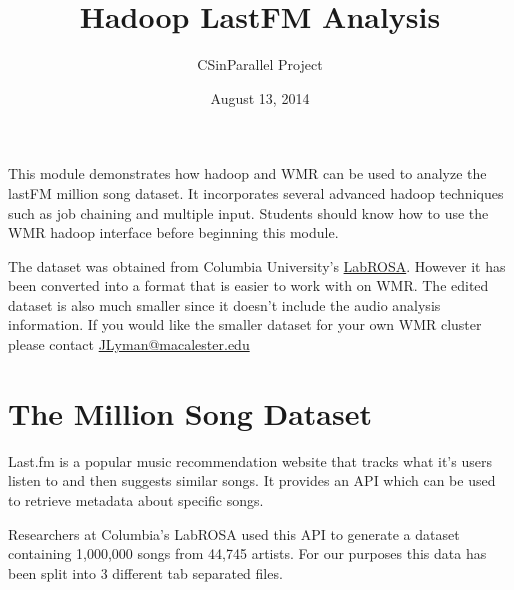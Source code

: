 \documentclass[letterpaper,10pt,openany,oneside]{sphinxmanual}
\title{Hadoop LastFM Analysis}
\date{August 13, 2014}
\author{CSinParallel Project}
\begin{document}
\maketitle
\tableofcontents
{}\label{index::doc}


This module demonstrates how hadoop and WMR can be used to
analyze the lastFM million song dataset. It incorporates several
advanced hadoop techniques such as job chaining and multiple
input. Students should know how to use the WMR hadoop interface
before beginning this module.

The dataset was obtained from Columbia University's
\href{http://labrosa.ee.columbia.edu/millionsong/lastfm}{LabROSA}.
However it has been converted into a format that is easier to work
with on WMR. The edited dataset is also much smaller since it doesn't
include the audio analysis information. If you would like the smaller
dataset for your own WMR cluster please contact \href{mailto:JLyman@macalester.edu}{JLyman@macalester.edu}


\chapter{The Million Song Dataset}
\label{0-Introduction/Introduction::doc}\label{0-Introduction/Introduction:the-million-song-dataset}\label{0-Introduction/Introduction:hadoop-lastfm-analysis}
Last.fm is a popular music recommendation website that tracks
what it's users listen to and then suggests similar songs.
It provides an API which can be used to retrieve metadata about
specific songs.

Researchers at Columbia's LabROSA used this API to generate a
dataset containing 1,000,000 songs from 44,745 artists. For our
purposes this data has been split into 3 different tab separated
files.
\end{document}
